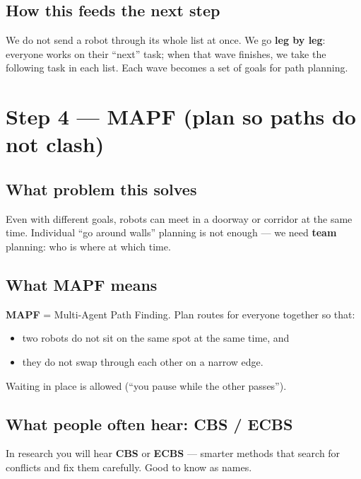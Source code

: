 \documentclass[11pt,a4paper]{article}
\begin{document}
\subsection{How this feeds the next step}

We do not send a robot through its whole list at once. We go \textbf{leg by
leg}: everyone works on their ``next'' task; when that wave finishes, we take
the following task in each list. Each wave becomes a set of goals for path
planning.

\section{Step 4 --- MAPF (plan so paths do not clash)}

\subsection{What problem this solves}

Even with different goals, robots can meet in a doorway or corridor at the
same time. Individual ``go around walls'' planning is not enough --- we need
\textbf{team} planning: who is where at which time.

\subsection{What MAPF means}

\textbf{MAPF} = Multi-Agent Path Finding. Plan routes for everyone together so
that:
\begin{itemize}[leftmargin=*]
  \item two robots do not sit on the same spot at the same time, and
  \item they do not swap through each other on a narrow edge.
\end{itemize}
Waiting in place is allowed (``you pause while the other passes'').

\subsection{What people often hear: CBS / ECBS}

In research you will hear \textbf{CBS} or \textbf{ECBS} --- smarter methods that
search for conflicts and fix them carefully. Good to know as names.
\end{document}
